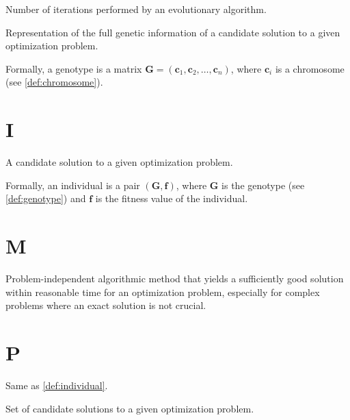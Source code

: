     \begin{definition}[Generation]
    \label{def:generation}
      Number of iterations performed by an evolutionary algorithm.
    \end{definition}

    \begin{definition}[Genotype]
    \label{def:genotype}
      Representation of the full genetic information of a candidate solution to a given optimization
      problem.

      Formally, a genotype is a matrix \(\mathbf{G} = (\textbf{c}_1, \textbf{c}_2, \dots, 
      \textbf{c}_n)\), where \(\textbf{c}_i\) is a chromosome (see \vref{def:chromosome}).
    \end{definition}

  \section*{I}
    \begin{definition}[Individual]
    \label{def:individual}
      A candidate solution to a given optimization problem.

      Formally, an individual is a pair \((\mathbf{G}, \mathbf{f})\), where \(\mathbf{G}\) is the
      genotype (see \vref{def:genotype}) and \(\mathbf{f}\) is the fitness value of the
      individual.
    \end{definition}

  \section*{M}
    \begin{definition}[Metaheuristics]
    \label{def:metaheuristic}
      Problem-independent algorithmic method that yields a sufficiently good solution within 
      reasonable time for an optimization problem, especially for complex problems where an exact 
      solution is not crucial.
    \end{definition}
  
  \section*{P}
    \begin{definition}[Phenotype]
    \label{def:phenotype}
      Same as \vref{def:individual}.
    \end{definition}

    \begin{definition}[Population]
    \label{def:population}
      Set of candidate solutions to a given optimization problem.
    \end{definition}

